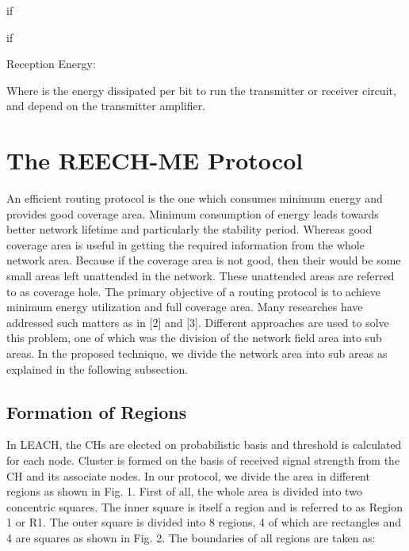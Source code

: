 \documentclass[journal]{IEEEtran}
\begin{document}
if 

if 

 Reception Energy:


Where  is the energy dissipated per bit to run the transmitter or receiver circuit,  and  depend on the transmitter amplifier.

\section{The REECH-ME Protocol}
An efficient routing protocol is the one which consumes minimum energy and provides good coverage area. Minimum consumption of energy leads towards better network lifetime and particularly the stability period. Whereas good coverage area is useful in getting the required information from the whole network area. Because if the coverage area is not good, then their would be some small areas left unattended in the network. These unattended areas are referred to as coverage hole. The primary objective of a routing protocol is to achieve minimum energy utilization and full coverage area. Many researches have addressed such matters as in [2] and [3]. Different approaches are used to solve this problem, one of which was the division of the network field area into sub areas. In the proposed technique, we divide the network area into sub areas as explained in the following subsection.

\subsection{Formation of Regions}
In LEACH, the CHs are elected on probabilistic basis and threshold is calculated for each node. Cluster is formed on the basis of received signal strength from the CH and its associate nodes. In our protocol, we divide the area in different regions as shown in Fig. 1. First of all, the whole area is divided into two concentric squares. The inner square is itself a region and is referred to as Region 1 or R1. The outer square is divided into 8 regions, 4 of which are rectangles and 4 are squares as shown in Fig. 2. The boundaries of all regions are taken as:
\end{document}
